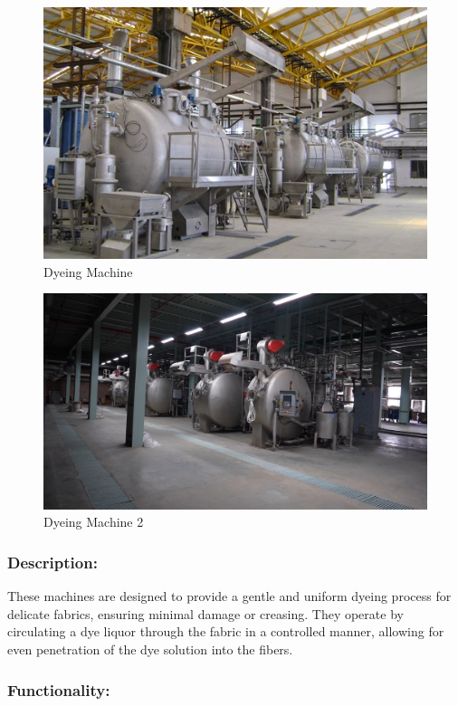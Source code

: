 \begin{figure}[h!]
  \centering
  \includegraphics[width=0.8\linewidth]{figs/production/image1.png}
  \caption{Dyeing Machine}
  \label{fig:Dyeing Machine}
\end{figure}

\begin{figure}[h!]
  \centering
  \includegraphics[width=0.8\linewidth]{figs/dyeing.jpg}
  \caption{Dyeing Machine 2}
  \label{fig:Dyeing Machine 2}
\end{figure}

\subsubsection{Description:}


These machines are designed to provide a gentle and uniform
dyeing process for delicate fabrics, ensuring minimal damage or
creasing. They operate by circulating a dye liquor through the fabric in
a controlled manner, allowing for even penetration of the dye solution
into the fibers.


\subsubsection{Functionality:}

